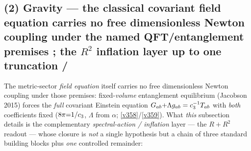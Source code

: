 \subsection*{(2) Gravity --- the classical covariant field equation carries no free dimensionless Newton coupling under the named QFT/entanglement premises \mC; the $R^2$ inflation layer up to one truncation \mE/\mC}
The metric-sector \emph{field equation} itself carries no free dimensionless Newton coupling under those premises: fixed-\emph{volume} entanglement
equilibrium (Jacobson 2015) forces the \emph{full} covariant Einstein equation
$G_{ab}{+}\Lambda g_{ab}=c_3^{-1}T_{ab}$ with \emph{both} coefficients fixed
($8\pi{=}1/c_3$, $\Lambda$ from $\alpha$; \vref{v358}/\vref{v359}). What \emph{this} subsection details is
the complementary \emph{spectral-action / inflation} layer --- the $R+R^2$ readout --- whose closure is
\emph{not} a single hypothesis but a chain of three standard building blocks plus \emph{one} controlled
remainder:

\begin{center}
\end{center}

